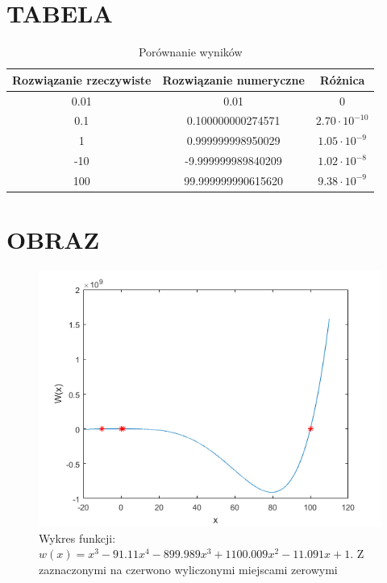 \documentclass[11pt,a4paper]{article}
\begin{document}
\section*{TABELA}
\begin{table}[h]
	\centering
	\caption{Porównanie wyników}
	\begin{tabular}{|c|c|c|}
		\hline
		Rozwiązanie rzeczywiste & Rozwiązanie numeryczne  & Różnica\\
		\hline
		0.01    &  0.01  & 0\\
		\hline
		0.1  &  0.100000000274571  & $2.70\cdot10^{-10}$\\
		\hline
		1  &  0.999999998950029  & $1.05\cdot10^{-9} $\\
		\hline
		-10  &  -9.999999989840209  & $1.02\cdot10^{-8} $\\
		\hline
		100  &  99.999999990615620  & $9.38\cdot10^{-9} $\\
		\hline		
		\end{tabular}
\end{table}

\section*{OBRAZ}
\begin{figure}[h]
	\centering
	\includegraphics[width=13cm]{obrazDo_Szablonu.png}
	\caption{Wykres funkcji: $w(x)=x^3-91.11x^4-899.989x^3+1100.009x^2-11.091x+1$. Z zaznaczonymi na czerwono wyliczonymi  miejscami zerowymi}
\end{figure}
\end{document}
